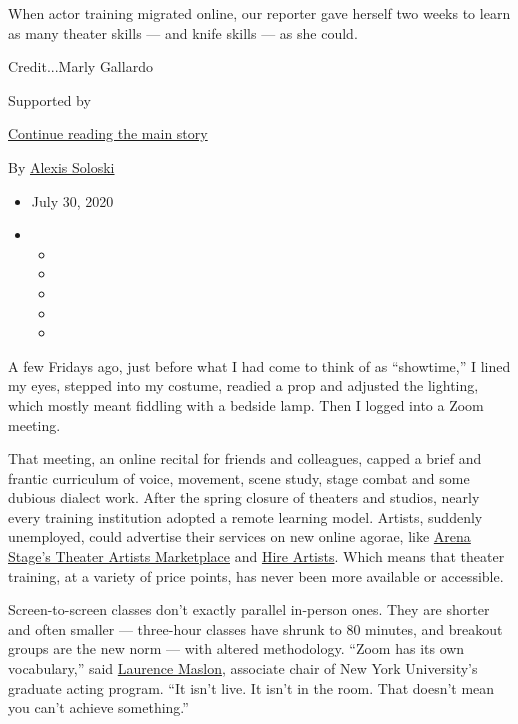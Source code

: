 When actor training migrated online, our reporter gave herself two weeks
to learn as many theater skills --- and knife skills --- as she could.

Credit...Marly Gallardo

Supported by

\protect\hyperlink{after-sponsor}{Continue reading the main story}

By \href{https://www.nytimes3xbfgragh.onion/by/alexis-soloski}{Alexis
Soloski}

\begin{itemize}
\item
  July 30, 2020
\item
  \begin{itemize}
  \item
  \item
  \item
  \item
  \item
  \end{itemize}
\end{itemize}

A few Fridays ago, just before what I had come to think of as
``showtime,'' I lined my eyes, stepped into my costume, readied a prop
and adjusted the lighting, which mostly meant fiddling with a bedside
lamp. Then I logged into a Zoom meeting.

That meeting, an online recital for friends and colleagues, capped a
brief and frantic curriculum of voice, movement, scene study, stage
combat and some dubious dialect work. After the spring closure of
theaters and studios, nearly every training institution adopted a remote
learning model. Artists, suddenly unemployed, could advertise their
services on new online agorae, like
\href{https://www.arenastage.org/artistsmarketplace}{Arena Stage's
Theater Artists Marketplace} and \href{https://hireartists.org/}{Hire
Artists}. Which means that theater training, at a variety of price
points, has never been more available or accessible.

Screen-to-screen classes don't exactly parallel in-person ones. They are
shorter and often smaller --- three-hour classes have shrunk to 80
minutes, and breakout groups are the new norm --- with altered
methodology. ``Zoom has its own vocabulary,'' said
\href{https://tisch.nyu.edu/about/directory/grad-acting/102885218}{Laurence
Maslon}, associate chair of New York University's graduate acting
program. ``It isn't live. It isn't in the room. That doesn't mean you
can't achieve something.''

